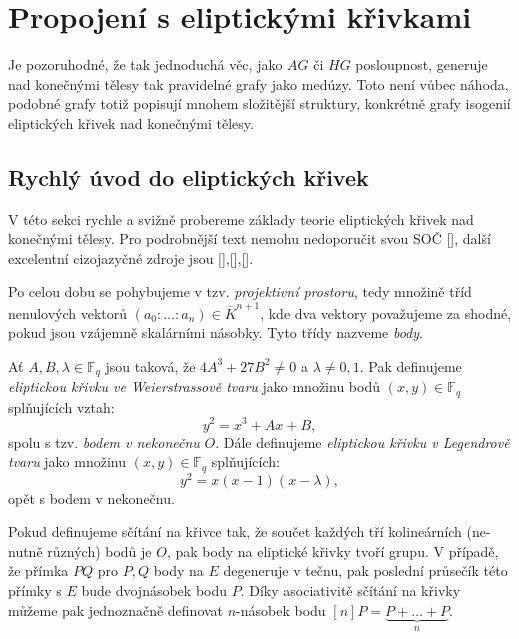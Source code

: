 \documentclass[12pt]{report}
\begin{document}






\chapter{Propojení s eliptickými křivkami}

Je pozoruhodné, že tak jednoduchá věc, jako $AG$ či $HG$ posloupnost, generuje nad konečnými tělesy tak pravidelné grafy jako medúzy. Toto není vůbec náhoda, podobné grafy totiž popisují mnohem složitější struktury, konkrétně grafy isogenií eliptických křivek nad konečnými tělesy.

\section{Rychlý úvod do eliptických křivek}
V této sekci rychle a svižně probereme základy teorie eliptických křivek nad konečnými tělesy. Pro podrobnější text nemohu nedoporučit svou SOČ [], další excelentní cizojazyčné zdroje jsou [],[],[].

Po celou dobu se pohybujeme v tzv. \textit{projektivní prostoru}, tedy množině tříd nenulových vektorů $(a_0: \dots: a_n) \in \overline{K}^{n+1}$, kde dva vektory považujeme za shodné, pokud jsou vzájemně skalárními násobky. Tyto třídy nazveme \textit{body}.


\begin{definice}
Ať $A,B,\lambda \in \mathbb{F}_q$ jsou taková, že $4 A^3 + 27 B^2 \neq 0$ a $\lambda \neq 0, 1.$ Pak definujeme \textit{eliptickou křivku ve Weierstrassově tvaru} jako množinu bodů $(x,y) \in \mathbb{F}_q$ splňujících vztah:
$$y^2 = x^3 + Ax + B,$$
spolu s tzv. \textit{bodem v nekonečnu} $O$. Dále definujeme \textit{eliptickou křivku v Legendrově tvaru} jako množinu $(x,y) \in \mathbb{F}_q$ splňujících:
$$y^2 = x(x-1)(x-\lambda),$$
opět s bodem v nekonečnu.
\end{definice}
Pokud definujeme sčítání na křivce tak, že součet každých tří kolineárních (ne-nutně různých) bodů je $O$, pak body na eliptické křivky tvoří grupu. V případě, že přímka $PQ$ pro $P,Q$ body na $E$ degeneruje v tečnu, pak poslední průsečík této přímky s $E$ bude dvojnásobek bodu $P$. Díky asociativitě sčítání na křivky můžeme pak jednoznačně definovat $n$-násobek bodu $[n]P = \underbrace{P+\dots+P}_{n}$.
\end{document}
